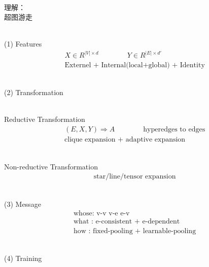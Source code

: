 \documentclass{article}
\begin{document}
~ \\[3pt]
\begin{CJK}{UTF8}{gbsn}
    理解： \\[3pt]
        超图游走  \\[3pt]
\end{CJK}


~ \\[3pt]
(1) Features
\begin{align*}
    & X \in R^{ |V| \times d } \qquad \qquad Y \in R^{ |E| \times d'} \\[3pt]
    & \text{Externel + Internal(local+global) + Identity}
\end{align*}


~ \\[3pt]
(2) Transformation

~ \\[3pt]
Reductive Transformation
\begin{align*}
    & ( E, X, Y ) \Rightarrow A 
    \qquad \qquad 
    \text{hyperedges to edges} \\[3pt]
    & \text{clique expansion + adaptive expansion}
\end{align*}

~ \\[3pt]
Non-reductive Transformation
\begin{align*}
    & \text{star/line/tensor expansion}
\end{align*}


~ \\[3pt]
(3) Message
\begin{align*}
    & \text{whose: v-v \ v-e \ e-v} \\[3pt]
    & \text{what : e-consistent + e-dependent} \\[3pt]
    & \text{how  : fixed-pooling + learnable-pooling} 
\end{align*}


~ \\[3pt]
(4) Training
\end{document}
